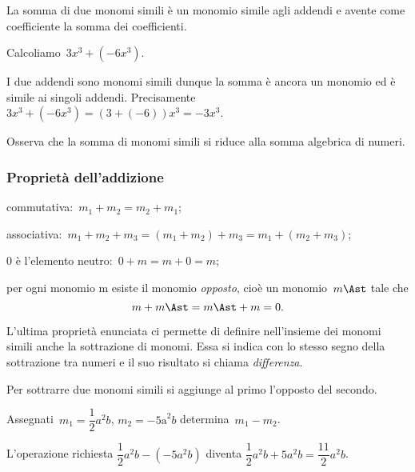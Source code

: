 La somma di due monomi simili è un monomio simile agli addendi e
avente come coefficiente la somma dei coefficienti.

\begin{exrig}
 \begin{esempio}
Calcoliamo~$3x^{3}+(-6x^{3})$.

I due addendi sono monomi simili dunque la somma è ancora un monomio
ed è simile ai singoli addendi. Precisamente
$3x^{3}+(-6x^{3})=(3+(-6))x^{3}=-3x^{3}$.

Osserva che la somma di monomi simili si riduce alla somma algebrica di numeri.
 \end{esempio}
\end{exrig}

\ovalbox{\risolvi \ref{ese:10.23}}

\subsubsection{Proprietà dell'addizione}

\begin{enumeratea}
 \item commutativa:~$m_{{1}}+m_{2}=m_{2}+m_{{1}}$;
 \item associativa:~$m_{{1}}+m_{2}+m_{3}=(m_{{1}}+m_{2})+m_{3}=m_{{1}}+(m_{2}+m_{3})$;
 \item 0 è l'elemento neutro:~$0+m=m+0=m$;
 \item per ogni monomio m esiste il monomio \emph{opposto}, cioè un
 monomio~$m\Ast$ tale che
 \[m + m\Ast = m\Ast +m=0.\]
\end{enumeratea}

L'ultima proprietà enunciata ci permette di definire
nell'insieme dei monomi simili anche la sottrazione di
monomi. Essa si indica con lo stesso segno della sottrazione tra numeri
e il suo risultato si chiama \emph{differenza}.

\osservazione Per sottrarre due monomi simili si aggiunge al primo
l'opposto del secondo.

\begin{exrig}
 \begin{esempio}
Assegnati~$m_{{1}}=\dfrac{1}{2}a^{2}b$, $m_{2}=-\text{5a}^{2}b$ determina~$m_{1} - m_{2}$.

L'operazione richiesta
$\dfrac{1}{2}a^{2}b-(-5a^{2}b)$ diventa
$\dfrac{1}{2}a^{2}b+5a^{2}b=\dfrac{11}{2}a^{2}b$.
 \end{esempio}
\end{exrig}

